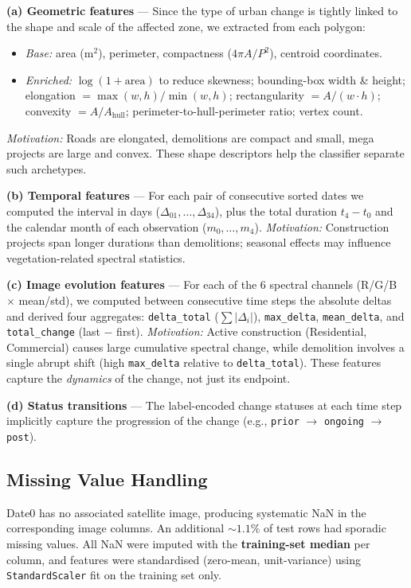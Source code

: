 \documentclass[11pt,a4paper]{article}
\begin{document}
\textbf{(a) Geometric features} --- Since the type of urban change is tightly linked to the shape and scale of the affected zone, we extracted from each polygon:
\begin{itemize}[nosep,leftmargin=12pt]
    \item \textit{Base:} area ($\text{m}^2$), perimeter, compactness ($4\pi A / P^2$), centroid coordinates.
    \item \textit{Enriched:} $\log(1{+}\text{area})$ to reduce skewness; bounding-box width \& height; elongation $= \max(w,h)/\min(w,h)$; rectangularity $= A / (w \cdot h)$; convexity $= A / A_{\text{hull}}$; perimeter-to-hull-perimeter ratio; vertex count.
\end{itemize}
\textit{Motivation:} Roads are elongated, demolitions are compact and small, mega projects are large and convex. These shape descriptors help the classifier separate such archetypes.

\textbf{(b) Temporal features} --- For each pair of consecutive sorted dates we computed the interval in days ($\Delta_{01}, \ldots, \Delta_{34}$), plus the total duration $t_4 - t_0$ and the calendar month of each observation ($m_0, \ldots, m_4$).
\textit{Motivation:} Construction projects span longer durations than demolitions; seasonal effects may influence vegetation-related spectral statistics.

\textbf{(c) Image evolution features} --- For each of the 6 spectral channels (R/G/B $\times$ mean/std), we computed between consecutive time steps the absolute deltas and derived four aggregates: \texttt{delta\_total} ($\sum|\Delta_i|$), \texttt{max\_delta}, \texttt{mean\_delta}, and \texttt{total\_change} (last $-$ first).
\textit{Motivation:} Active construction (Residential, Commercial) causes large cumulative spectral change, while demolition involves a single abrupt shift (high \texttt{max\_delta} relative to \texttt{delta\_total}). These features capture the \emph{dynamics} of the change, not just its endpoint.

\textbf{(d) Status transitions} --- The label-encoded change statuses at each time step implicitly capture the progression of the change (e.g., \texttt{prior} $\to$ \texttt{ongoing} $\to$ \texttt{post}).

\subsection{Missing Value Handling}
Date0 has no associated satellite image, producing systematic NaN in the corresponding image columns. An additional ${\sim}1.1\%$ of test rows had sporadic missing values. All NaN were imputed with the \textbf{training-set median} per column, and features were standardised (zero-mean, unit-variance) using \texttt{StandardScaler} fit on the training set only.
\end{document}
